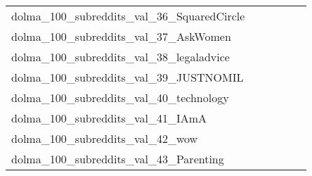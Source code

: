{\begin{longtable}{m{6cm}m{1.7cm}m{1.7cm}m{1.7cm}m{1.7cm}m{1.7cm}}
	dolma\_100\_subreddits\_val\_36\_SquaredCircle  & \colorbox[HTML]{ffffe5}{\makebox[\mywidth][c]{25.87}} & \colorbox[HTML]{e0f2a8}{\makebox[\mywidth][c]{24.31}} & \colorbox[HTML]{ffffe5}{\makebox[\mywidth][c]{25.83}} & \colorbox[HTML]{e5f5ac}{\makebox[\mywidth][c]{24.34}} & \colorbox[HTML]{77c578}{\makebox[\mywidth][c]{24.03}}\\
	dolma\_100\_subreddits\_val\_37\_AskWomen  & \colorbox[HTML]{ffffe5}{\makebox[\mywidth][c]{17.72}} & \colorbox[HTML]{bee496}{\makebox[\mywidth][c]{16.81}} & \colorbox[HTML]{ffffe5}{\makebox[\mywidth][c]{17.77}} & \colorbox[HTML]{d3eda0}{\makebox[\mywidth][c]{16.85}} & \colorbox[HTML]{77c578}{\makebox[\mywidth][c]{16.72}}\\
	dolma\_100\_subreddits\_val\_38\_legaladvice  & \colorbox[HTML]{ffffe5}{\makebox[\mywidth][c]{18.66}} & \colorbox[HTML]{c3e698}{\makebox[\mywidth][c]{17.75}} & \colorbox[HTML]{ffffe5}{\makebox[\mywidth][c]{18.92}} & \colorbox[HTML]{bfe596}{\makebox[\mywidth][c]{17.74}} & \colorbox[HTML]{77c578}{\makebox[\mywidth][c]{17.64}}\\
	dolma\_100\_subreddits\_val\_39\_JUSTNOMIL  & \colorbox[HTML]{ffffe5}{\makebox[\mywidth][c]{24.25}} & \colorbox[HTML]{bbe395}{\makebox[\mywidth][c]{23.16}} & \colorbox[HTML]{ffffe5}{\makebox[\mywidth][c]{24.86}} & \colorbox[HTML]{e4f4ab}{\makebox[\mywidth][c]{23.32}} & \colorbox[HTML]{77c578}{\makebox[\mywidth][c]{23.02}}\\
	dolma\_100\_subreddits\_val\_40\_technology  & \colorbox[HTML]{ffffe5}{\makebox[\mywidth][c]{23.39}} & \colorbox[HTML]{c3e698}{\makebox[\mywidth][c]{22.09}} & \colorbox[HTML]{ffffe5}{\makebox[\mywidth][c]{23.52}} & \colorbox[HTML]{e4f4ab}{\makebox[\mywidth][c]{22.21}} & \colorbox[HTML]{77c578}{\makebox[\mywidth][c]{21.95}}\\
	dolma\_100\_subreddits\_val\_41\_IAmA  & \colorbox[HTML]{ffffe5}{\makebox[\mywidth][c]{19.83}} & \colorbox[HTML]{f0f9b4}{\makebox[\mywidth][c]{18.83}} & \colorbox[HTML]{ffffe5}{\makebox[\mywidth][c]{19.86}} & \colorbox[HTML]{d1ec9f}{\makebox[\mywidth][c]{18.71}} & \colorbox[HTML]{77c578}{\makebox[\mywidth][c]{18.56}}\\
	dolma\_100\_subreddits\_val\_42\_wow  & \colorbox[HTML]{ffffe5}{\makebox[\mywidth][c]{31.26}} & \colorbox[HTML]{e4f4ab}{\makebox[\mywidth][c]{29.25}} & \colorbox[HTML]{ffffe5}{\makebox[\mywidth][c]{31.44}} & \colorbox[HTML]{f2fab5}{\makebox[\mywidth][c]{29.39}} & \colorbox[HTML]{77c578}{\makebox[\mywidth][c]{28.82}}\\
	dolma\_100\_subreddits\_val\_43\_Parenting  & \colorbox[HTML]{ffffe5}{\makebox[\mywidth][c]{20.15}} & \colorbox[HTML]{98d485}{\makebox[\mywidth][c]{19.11}} & \colorbox[HTML]{ffffe5}{\makebox[\mywidth][c]{20.43}} & \colorbox[HTML]{e6f5ad}{\makebox[\mywidth][c]{19.30}} & \colorbox[HTML]{77c578}{\makebox[\mywidth][c]{19.06}}\\

\end{longtable}}
